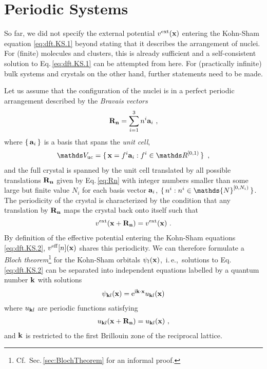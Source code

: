 \vfill

\section{Periodic Systems}
\label{sec:theory.periodic.1}
So far, we did not specify the external potential $v^{\rm ext} ({\bf x})$ entering the Kohn-Sham equation \eqref{eq:dft.KS.1} beyond stating that it describes the arrangement of nuclei. For (finite) molecules and clusters, this is already sufficient and a self-consistent solution to Eq.\,\eqref{eq:dft.KS.1} can be attempted from here. For (practically infinite) bulk systems and crystals on the other hand, further statements need to be made.

Let us assume that the configuration of the nuclei is in a perfect periodic arrangement described by the 
\emph{Bravais vectors}
\begin{align}
	{\bf R}_{\bf n} 
		= \sum_{i=1}^{3} n^i {\bf a}_i~,
	\label{eq:Rn}
\end{align}
where $\set{{\bf a}_i}$ is a basis that spans
the \emph{unit cell},
\begin{align}
	\mathds V_{\rm uc}
		= \set{{\bf x} = f^i {\bf a}_i : f^i \in \mathds R^{[0, 1)}}~,
	\label{eq:dft.Bloch.unitcell}
\end{align}
\REM{Use $[-0.5, 0.5)$}
and the full crystal is spanned by the unit cell translated by all possible translations $\bf R_n$ given by Eq.\,\eqref{eq:Rn} with integer numbers smaller than some large but finite value $N_i$ for each basis vector ${\bf a}_i$, $\set{n^i : n^i \in \mathds{N}^{[0, N_i)}}$. The periodicity of the crystal is characterized by the condition that any translation by $\bf R_n$ maps the crystal back onto itself such that
\begin{align}
	v^{\rm ext} ({\bf x} + {\bf R_n}) 
		= v^{\rm ext} ({\bf x})~.
	\label{eq:dft.Bloch.1}
\end{align}
By definition of the effective potential entering the Kohn-Sham equations \eqref{eq:dft.KS.2}, $v^{\rm eff} [n] ({\bf x})$ shares this periodicity. We can therefore formulate a \emph{Bloch theorem}\footnote{Cf.~Sec.\,\ref{sec:BlochTheorem} for an informal proof.}
for the Kohn-Sham orbitals $\psi_l ({\bf x})$,~i.\,e.,~solutions to Eq.\,\eqref{eq:dft.KS.2} can be separated into independent equations labelled by a quantum number $\bf k$ with solutions
\begin{align}
	\psi_{{\bf k} l} ({\bf x}) 
		= {\rm e}^{\im {\bf k} \cdot {\bf x}} u_{{\bf k} l} ({\bf x})
	\label{eq:dft.Bloch.2}
\end{align}
where $u_{{\bf k} l}$ are periodic functions satisfying
\begin{align}
	u_{{\bf k} l} ({\bf x} + {\bf R_n})
		= u_{{\bf k} l} ({\bf x})~,
	\label{eq:dft.Bloch.3}
\end{align}
and $\bf k$ is restricted to the first Brillouin zone of the reciprocal lattice.

